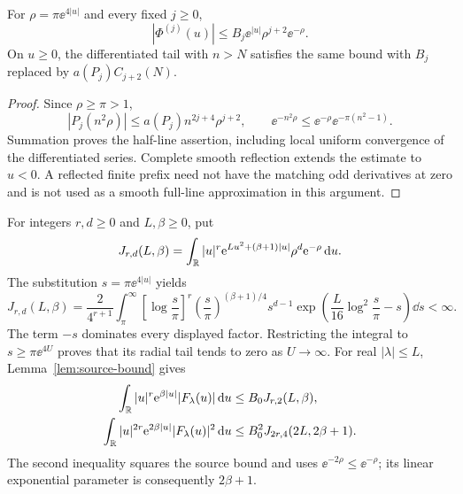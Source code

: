\begin{lemma}\label{lem:source-bound}
For \(\rho=\pi\ee^{4|u|}\) and every fixed \(j\geq0\),
\begin{equation}\label{eq:Phi-bound}
 |\Phi^{(j)}(u)|\leq B_j\ee^{|u|}\rho^{j+2}\ee^{-\rho}.
\end{equation}
On \(u\geq0\), the differentiated tail with \(n>N\) satisfies the
same bound with \(B_j\) replaced by \(a(P_j)C_{j+2}(N)\).
\end{lemma}
\begin{proof}
Since \(\rho\geq\pi>1\),
\[
 |P_j(n^2\rho)|\leq a(P_j)n^{2j+4}\rho^{j+2},\qquad
 \ee^{-n^2\rho}\leq\ee^{-\rho}\ee^{-\pi(n^2-1)}.
\]
Summation proves the half-line assertion, including local uniform
convergence of the differentiated series. Complete smooth reflection
extends the estimate to \(u<0\). A reflected finite prefix need not
have the matching odd derivatives at zero and is not used as a smooth
full-line approximation in this argument.
\end{proof}

For integers \(r,d\geq0\) and \(L,\beta\geq0\), put
\begin{equation}\label{eq:J}
 J_{r,d}(L,\beta)=\int_\mathbb R |u|^r
 \mathrm e^{Lu^2+(\beta+1)|u|}\rho^d\mathrm e^{-\rho}\,\mathrm d u.
\end{equation}
The substitution \(s=\pi\ee^{4|u|}\) yields
\begin{equation}\label{eq:J-transformed}
 J_{r,d}(L,\beta)=\frac{2}{4^{r+1}}
 \int_\pi^\infty\!\left[\log\frac{s}{\pi}\right]^r
 \left(\frac{s}{\pi}\right)^{(\beta+1)/4}s^{d-1}
 \exp\!\left(\frac{L}{16}\log^2\frac{s}{\pi}-s\right)\dd s<\infty.
\end{equation}
The term \(-s\) dominates every displayed factor. Restricting the
integral to \(s\geq\pi\ee^{4U}\) proves that its radial tail tends to
zero as \(U\to\infty\).
For real \(|\lambda|\leq L\), Lemma~\ref{lem:source-bound} gives
\begin{align}
 \int_\mathbb R |u|^r\mathrm e^{\beta|u|}|F_\lambda(u)|\,\mathrm d u
 &\leq B_0J_{r,2}(L,\beta),\label{eq:L1}\\
 \int_\mathbb R |u|^{2r}\mathrm e^{2\beta|u|}|F_\lambda(u)|^2\,\mathrm d u
 &\leq B_0^2J_{2r,4}(2L,2\beta+1).\label{eq:L2}
\end{align}
The second inequality squares the source bound and uses
\(\ee^{-2\rho}\leq\ee^{-\rho}\); its linear exponential parameter
is consequently \(2\beta+1\).

